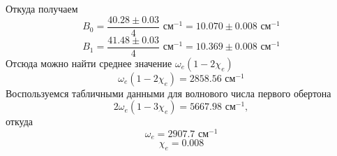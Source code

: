Откуда получаем
\begin{equation}
B_0 = \dfrac{40.28 \pm 0.03}{4} \text{ см}^{-1} = 10.070 \pm 0.008 \text{ см$^{-1}$}
\end{equation}
\begin{equation}
B_1 = \dfrac{41.48 \pm 0.03}{4} \text{ см}^{-1} = 10.369 \pm 0.008 \text{ см$^{-1}$}
\end{equation}
Отсюда можно найти среднее значение $\omega_e(1-2\chi_e)$
\begin{equation}
\omega_e(1-2\chi_e) = 
2858.56
\text{ см$^{-1}$}
\end{equation}
Воспользуемся табличными данными для волнового числа первого обертона $$2\omega_e(1-3\chi_e) = 5667.98 \text{ см$^{-1}$},$$ откуда
\begin{equation}
\omega_e = 
2907.7
 \text{ см$^{-1}$}
\end{equation}
\begin{equation}
\chi_e = 
0.008
\end{equation}

